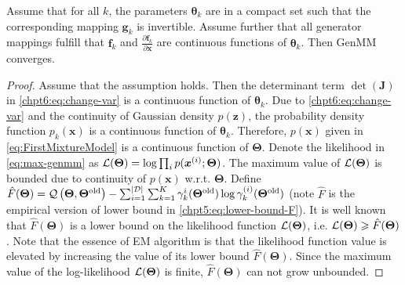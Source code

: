 \begin{proposition}
  Assume that for all $k$, the parameters $\bm{\theta}_k$ are in a compact set such that the corresponding mapping $\bm{g}_k$ is invertible. Assume further that all generator mappings fulfill that $\bm{f}_k$ and $\frac{\partial \bm{f}_k}{\partial \bm{x}}$ are continuous functions of $\bm{\theta}_k$. Then GenMM converges. 
\end{proposition}
\begin{proof}
  Assume that the assumption holds. Then the determinant term $\det(\bm{J})$ in \eqref{chpt6:eq:change-var} is a continuous function of $\bm{\theta}_k$. Due to \eqref{chpt6:eq:change-var} and the continuity of Gaussian density $p(\bm{z})$, the probability density function $p_k(\bm{x})$ is a continuous function of $\bm{\theta}_k$. Therefore, $p(\bm{x})$ given in \eqref{eq:FirstMixtureModel} is a continuous function of $\bm{\Theta}$. Denote the likelihood in \eqref{eq:max-genmm} as $\mathcal{L}(\bm{\Theta})=\log \textstyle\prod_{i} p(\bm{x}^{(i)};\bm{\Theta})$. The maximum value of $\mathcal{L}(\bm{\Theta})$ is bounded due to continuity of $p(\bm{x})$ w.r.t. $\bm{\Theta}$.
  Define $\hat{F}(\bm{\Theta}) = \mathcal{Q}\left(\bm{\Theta},\bm{\Theta}^{\mathrm{old}}\right) - \sum_{i=1}^{| \mathcal{D} |}\sum_{k=1}^{K}\gamma_k^{i}(\bm{\Theta}^{\mathrm{old}}) \log\gamma_k^{(i)}(\bm{\Theta}^{\mathrm{old}})$ (note $\hat{F}$ is the empirical version of lower bound in \eqref{chpt5:eq:lower-bound-F}). It is well known that $\hat{F}(\bm{\Theta})$ is a lower bound on the likelihood function $\mathcal{L}(\bm{\Theta})$, i.e. $\mathcal{L}(\bm{\Theta}) \geqslant \hat{F}(\bm{\Theta})$. Note that the essence of EM algorithm is that the likelihood function value is elevated by increasing the value of its lower bound $\hat{F}(\bm{\Theta})$. Since the maximum value of the log-likelihood $\mathcal{L}(\bm{\Theta})$ is finite, $\hat{F}(\bm{\Theta})$ can not grow unbounded.

\end{proof}


